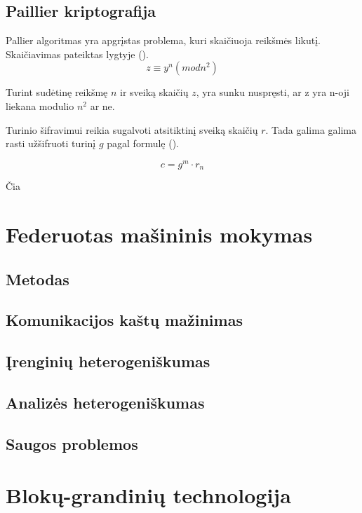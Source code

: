 \documentclass{VUMIFInfBakalaurinis}
\begin{document}
\subsection{Paillier kriptografija}
Pallier algoritmas yra apgrįstas problema, kuri skaičiuoja reikšmės likutį. Skaičiavimas pateiktas lygtyje ().
\begin{equation}
    z \equiv y^{n} (mod n^{2})
\end{equation}
\par Turint sudėtinę reikšmę $n$ ir sveiką skaičių $z$, yra sunku nuspręsti, ar z yra n-oji liekana modulio $n^{2}$ ar ne.
\par Turinio šifravimui reikia sugalvoti atsitiktinį sveiką skaičių $r$. Tada galima galima rasti užšifruoti turinį $g$ pagal formulę ().

\begin{equation}
    c = g^{m} \cdot r_{n}
\end{equation}

\par Čia 

\section{Federuotas mašininis mokymas}
\subsection{Metodas}
\subsection{Komunikacijos kaštų mažinimas}
\subsection{Įrenginių heterogeniškumas}
\subsection{Analizės heterogeniškumas}
\subsection{Saugos problemos}

\section{Blokų-grandinių technologija}
\end{document}
